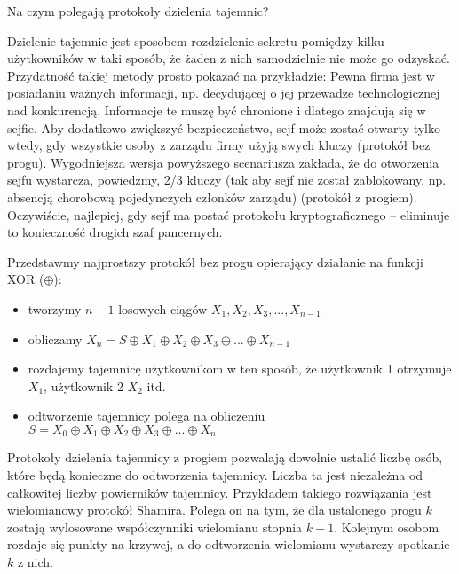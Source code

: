 \documentclass[answers,11pt]{exam}
\begin{document}
\begin{questions}

\question Na czym polegają protokoły dzielenia tajemnic? 
\begin{solution}
Dzielenie tajemnic jest sposobem rozdzielenie sekretu pomiędzy kilku użytkowników w taki sposób, że żaden z nich samodzielnie nie może go odzyskać. Przydatność takiej metody prosto pokazać na przykładzie: Pewna firma jest w posiadaniu ważnych informacji, np. decydującej o jej przewadze technologicznej nad konkurencją. Informacje te muszę być chronione i dlatego znajdują się w sejfie. Aby dodatkowo zwiększyć bezpieczeństwo, sejf może zostać otwarty tylko wtedy, gdy wszystkie osoby z zarządu firmy użyją swych kluczy (protokół bez progu). Wygodniejsza wersja powyższego scenariusza zakłada, że do otworzenia sejfu wystarcza, powiedzmy, 2/3 kluczy (tak aby sejf nie został zablokowany, np. absencją chorobową pojedynczych członków zarządu) (protokół z progiem). Oczywiście, najlepiej, gdy sejf ma postać protokołu kryptograficznego – eliminuje to konieczność drogich szaf pancernych.
\end{solution}



\begin{solution}
Przedstawmy najprostszy protokół bez progu opierający działanie na funkcji XOR ($\oplus$):
\begin{itemize}
\item tworzymy $n-1$ losowych ciągów $X_1, X_2, X_3, ..., X_{n-1}$
\item obliczamy $X_n = S \oplus X_1 \oplus X_2 \oplus X_3 \oplus ... \oplus X_{n-1}$ 
\item rozdajemy tajemnicę użytkownikom w ten sposób, że użytkownik 1 otrzymuje $X_1$, użytkownik 2 $X_2$ itd.
\item odtworzenie tajemnicy polega na obliczeniu $S = X_0 \oplus X_1 \oplus X_2 \oplus X_3 \oplus ... \oplus X_{n}$
\end{itemize}
\end{solution}

\begin{solution}
Protokoły dzielenia tajemnicy z progiem pozwalają dowolnie ustalić liczbę osób, które będą konieczne do odtworzenia tajemnicy. Liczba ta jest niezależna od całkowitej liczby powierników tajemnicy. Przykładem takiego rozwiązania jest wielomianowy protokół Shamira. Polega on na tym, że dla ustalonego progu $k$ zostają wylosowane współczynniki wielomianu stopnia $k-1$. Kolejnym osobom rozdaje się punkty na krzywej, a do odtworzenia wielomianu wystarczy spotkanie $k$ z nich.
\end{solution}


\end{questions}
\end{document}
